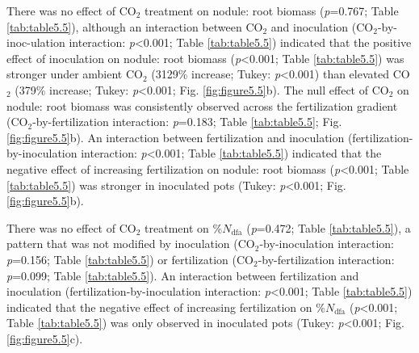 There was no effect of CO$_2$ treatment on nodule: root biomass (\textit{p}=0.767; Table \ref{tab:table5.5}), although an interaction between CO$_2$ and inoculation (CO$_2$-by-inoc-ulation interaction: \textit{p}<0.001; Table \ref{tab:table5.5}) indicated that the positive effect of inoculation on nodule: root biomass (\textit{p}<0.001; Table \ref{tab:table5.5}) was stronger under ambient CO$_2$ (3129\% increase; Tukey: \textit{p}<0.001) than elevated CO$_2$ (379\% increase; Tukey: \textit{p}<0.001; Fig. \ref{fig:figure5.5}b). The null effect of CO$_2$ on nodule: root biomass was consistently observed across the fertilization gradient (CO$_2$-by-fertilization interaction: \textit{p}=0.183; Table \ref{tab:table5.5}; Fig. \ref{fig:figure5.5}b). An interaction between fertilization and inoculation (fertilization-by-inoculation interaction: \textit{p}<0.001; Table \ref{tab:table5.5}) indicated that the negative effect of increasing fertilization on nodule: root biomass (\textit{p}<0.001; Table \ref{tab:table5.5}) was stronger in inoculated pots (Tukey: \textit{p}<0.001; Fig. \ref{fig:figure5.5}b). 

There was no effect of CO$_2$ treatment on \%$N_\mathrm{dfa}$ (\textit{p}=0.472; Table \ref{tab:table5.5}), a pattern that was not modified by inoculation (CO$_2$-by-inoculation interaction: \textit{p}=0.156; Table \ref{tab:table5.5}) or fertilization (CO$_2$-by-fertilization interaction: \textit{p}=0.099; Table \ref{tab:table5.5}). An interaction between fertilization and inoculation (fertilization-by-inoculation interaction: \textit{p}<0.001; Table \ref{tab:table5.5}) indicated that the negative effect of increasing fertilization on \%$N_\mathrm{dfa}$ (\textit{p}<0.001; Table \ref{tab:table5.5}) was only observed in inoculated pots (Tukey: \textit{p}<0.001; Fig. \ref{fig:figure5.5}c).

